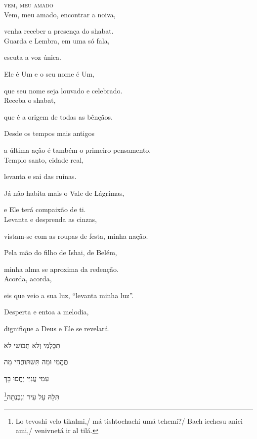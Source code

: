 \movetooddpage
\raggedright

\vspace*{1cm}
\textsc{vem, meu amado}\\[15pt]


Vem, meu amado, encontrar a noiva,

venha receber a presença do shabat.\\[10pt]

Guarda e Lembra, em uma só fala,

escuta a voz única.

Ele é Um e o seu nome é Um,

que seu nome seja louvado e celebrado.\\[10pt]

Receba o shabat,

que é a origem de todas as bênçãos.

Desde os tempos mais antigos

a última ação é também o primeiro pensamento.\\[10pt]

Templo santo, cidade real,

levanta e sai das ruínas.

Já não habita mais o Vale de Lágrimas,

e Ele terá compaixão de ti.\\[10pt]

Levanta e desprenda as cinzas,

vistam-se com as roupas de festa, minha nação.

Pela mão do filho de Ishai, de Belém,

minha alma se aproxima da redenção.\\[10pt]


Acorda, acorda,

eis que veio a sua luz, ``levanta minha luz''.

Desperta e entoa a melodia,

dignifique a Deus e Ele se revelará.\\[10pt]


\movetoevenpage
\raggedleft %

\vspace*{1cm}

תִכָּלְמִי וְלא תֵבושי לא 

תֶּהֱמִי וּמַה תִּשתּוחֲחִי מַה

עַמִּי עֲנִיֵּי יֶחֱסוּ בָּךְ

\footnote{Lo tevoshi velo tikalmi,/ má tishtochachi umá tehemi?/ Bach iechesu aniei ami,/ venivnetá ir al tilá.}תִּלָּהּ עַל עִיר וְנִבְנְתָה\\[10pt]


